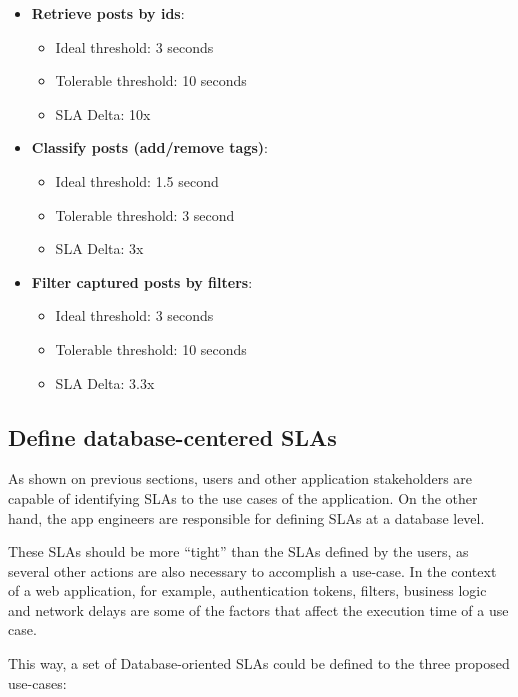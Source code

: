 \begin{itemize}
	\item{\textbf{Retrieve posts by ids}:
		\begin{itemize}
		\item{Ideal threshold: 3 seconds}
		\item{Tolerable threshold: 10 seconds}
		\item{SLA Delta: 10x}
		\end{itemize}
	}

	\item{\textbf{Classify posts (add/remove tags)}:
		\begin{itemize}
		\item{Ideal threshold: 1.5 second}
		\item{Tolerable threshold: 3 second}
		\item{SLA Delta: 3x}
		\end{itemize}
	}

	\item{\textbf{Filter captured posts by filters}:
		\begin{itemize}
		\item{Ideal threshold: 3 seconds}
		\item{Tolerable threshold: 10 seconds}
		\item{SLA Delta: 3.3x}
		\end{itemize}
	}

	\end{itemize}

\subsection{Define database-centered SLAs}
As shown on previous sections, users and other application stakeholders are capable of identifying SLAs to the use cases of the application. On the other hand, the app engineers are responsible for defining SLAs at a database level. 

These SLAs should be more ``tight'' than the SLAs defined by the users, as several other actions are also necessary to accomplish a use-case. In the context of a web application, for example, authentication tokens, filters, business logic and network delays are some of the factors that affect the execution time of a use case. 

This way, a set of Database-oriented SLAs could be defined to the three proposed use-cases: 

